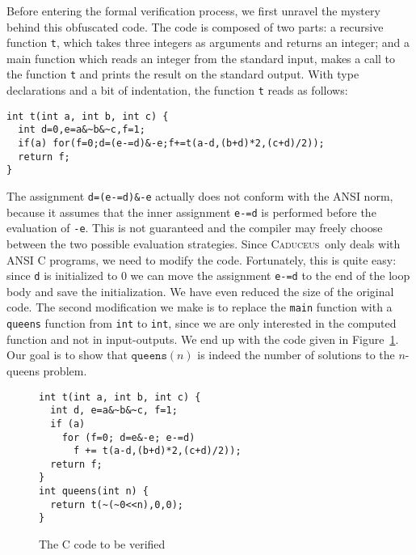 \documentclass[a4paper]{llncs}
\newcommand{\caduceus}{\textsc{Caduceus}}
\begin{document}
Before entering the formal verification process, we first unravel the
mystery behind this obfuscated code. The code is composed of two
parts: a recursive function \texttt{t}, which takes three integers as
arguments and returns an integer; and a main function which reads an
integer from the standard input, makes a call to the function
\texttt{t} and prints the result on the standard output.
With type declarations and a bit of indentation, the function
\texttt{t} reads as follows:
\begin{verbatim}
int t(int a, int b, int c) {
  int d=0,e=a&~b&~c,f=1;
  if(a) for(f=0;d=(e-=d)&-e;f+=t(a-d,(b+d)*2,(c+d)/2));
  return f;
}
\end{verbatim}
The assignment \verb!d=(e-=d)&-e! actually does not conform with the
ANSI norm, because it assumes that the inner assignment \verb!e-=d! is
performed before the evaluation of \verb!-e!. This is not guaranteed
and the compiler may freely choose between the two possible evaluation
strategies. Since \caduceus\ only deals with ANSI C programs,
we need to modify the code. Fortunately, this is quite easy:
since \verb!d! is initialized to 0 we can move the
assignment \verb!e-=d! to the end of the loop body and save the
initialization. We have even reduced the size of the original code.
The second modification we make is to replace the \texttt{main}
function with a \texttt{queens} function from \texttt{int} to
\texttt{int}, since we are only interested in the computed function
and not in input-outputs.
We end up with the code given in Figure~\ref{fig:code}. Our goal is
to show that $\mathtt{queens}(n)$ is indeed the number of
solutions to the $n$-queens problem.
\begin{figure}[t]
  \centering\hrulefill\vspace{-1em}
\begin{verbatim}
int t(int a, int b, int c) {
  int d, e=a&~b&~c, f=1;
  if (a)
    for (f=0; d=e&-e; e-=d)
      f += t(a-d,(b+d)*2,(c+d)/2));
  return f;
}
int queens(int n) {
  return t(~(~0<<n),0,0);
}
\end{verbatim}  
\vspace{-1.2em}\hrulefill\vspace{-1em}
  \caption{The C code to be verified}
  \label{fig:code}
\end{figure}
\end{document}
